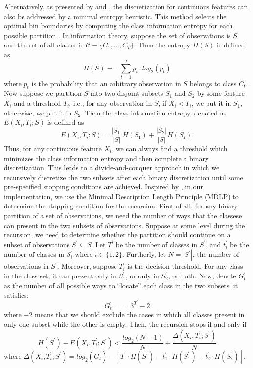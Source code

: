 \documentclass[twoside,11pt]{article}
\begin{document}
Alternatively, as presented by \citet{catlett1991changing} and \citet{fayyad1993multi}, the discretization for continuous features can also be addressed by a minimal entropy heuristic. This method selects the optimal bin boundaries by computing the class information entropy for each possible partition \citep{dougherty1995supervised}. In information theory, suppose the set of observations is $S$ and the set of all classes is $\mathcal{C}=\{C_1,\dots,C_T\}$. Then the entropy $H(S)$ is defined as 
\begin{equation*}
    H(S)=-\sum_{t=1}^T p_t\cdot log_2(p_t)
\end{equation*}
where $p_t$ is the probability that an arbitrary observation in $S$ belongs to class $C_t$. Now suppose we partition $S$ into two disjoint subsets $S_1$ and $S_2$ by some feature $X_i$ and a threshold $T_i$, i.e., for any observation in $S$, if $X_i<T_i$, we put it in $S_1$, otherwise, we put it in $S_2$. Then the class information entropy, denoted as $E(X_i,T_i;S)$ is defined as
\begin{equation*}
    E(X_i,T_i;S)=\frac{|S_1|}{|S|}H(S_1)+\frac{|S_2|}{|S|}H(S_2).
\end{equation*}
Thus, for any continuous feature $X_i$, we can always find a threshold which minimizes the class information entropy and then complete a binary discretization. This leads to a divide-and-conquer approach in which we recursively discretize the two subsets after each binary discretization until some pre-specified stopping conditions are achieved. Inspired by \citet{fayyad1993multi}, in our implementation, we use the Minimal Description Length Principle (MDLP) to determine the stopping condition for the recursion. First of all, for any binary partition of a set of observations, we need the number of ways that the classese can present in the two subsets of observations. Suppose at some level during the recursion, we need to determine whether the partition should continue on a subset of observations $S^\prime\subseteq S$. Let $T^\prime$ be the number of classes in $S^\prime$, and $t_i^\prime$ be the number of classes in $S_i^\prime$ where $i\in\{1,2\}$. Furtherly, let $N=|S^\prime|$, the number of observations in $S^\prime$. Moreover, suppose $T_i^\prime$ is the decision threshold. For any class in the class set, it can present only in $S_1^\prime$, or only in $S_2^\prime$, or both. Now, denote $G_t^\prime$ as the number of all possible ways to ``locate'' each class in the two subsets, it satisfies:
\begin{equation*}
G_t^\prime==3^{T^\prime}-2
\end{equation*}
where $-2$ means that we should exclude the cases in which all classes present in only one subset while the other is empty. Then, the recursion stops if and only if
\begin{equation*}
H(S^\prime)-E(X_i,T_i^\prime;S^\prime)<\frac{log_2(N-1)}{N}+\frac{\Delta(X_i,T_i^\prime;S^\prime)}{N}
\end{equation*}
where $\Delta(X_i,T_i^\prime;S^\prime)=log_2(G_t^\prime)-[T^\prime\cdot H(S^\prime)-t_1^\prime\cdot H(S_1^\prime)-t_2^\prime\cdot H(S_2^\prime)]$.
\end{document}
